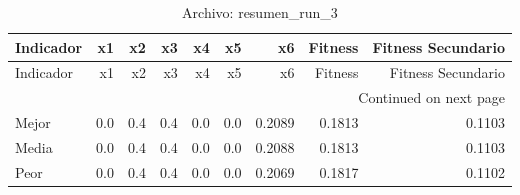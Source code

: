 \begin{longtable}{lrrrrrrrr}
\caption{Archivo: resumen\_run\_3}\label{tab:resumen_run_3} \\
\toprule
Indicador & x1 & x2 & x3 & x4 & x5 & x6 & Fitness & Fitness Secundario \\
\midrule
\endfirsthead
\toprule
Indicador & x1 & x2 & x3 & x4 & x5 & x6 & Fitness & Fitness Secundario \\
\midrule
\endhead
\midrule
\multicolumn{9}{r}{Continued on next page} \\
\midrule
\endfoot
\bottomrule
\endlastfoot
Mejor & 0.0 & 0.4 & 0.4 & 0.0 & 0.0 & 0.2089 & 0.1813 & 0.1103 \\
Media & 0.0 & 0.4 & 0.4 & 0.0 & 0.0 & 0.2088 & 0.1813 & 0.1103 \\
Peor & 0.0 & 0.4 & 0.4 & 0.0 & 0.0 & 0.2069 & 0.1817 & 0.1102 \\
\end{longtable}